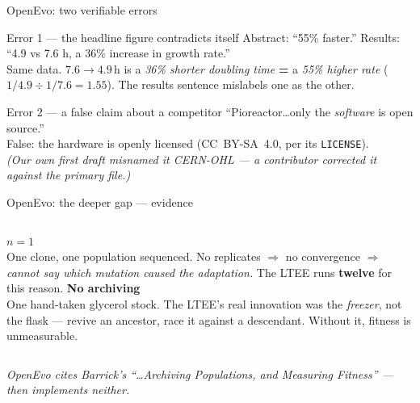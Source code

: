 \documentclass[aspectratio=169,11pt]{beamer}
\newcommand{\bd}[1]{\textcolor{bad}{#1}}
\begin{document}
\begin{frame}{OpenEvo: two verifiable errors}
  \begin{block}{\bd{Error 1} --- the headline figure contradicts itself}
  Abstract: ``\bd{55\% faster}.'' \quad Results: ``4.9 vs 7.6 h, a \bd{36\% increase in growth rate}.'' \\
  Same data. $7.6\!\to\!4.9$\,h is a \emph{36\% shorter doubling time} \textbf{=} a \emph{55\% higher rate}
  ($1/4.9 \div 1/7.6 = 1.55$). The results sentence mislabels one as the other.
  \end{block}
  \begin{block}{\bd{Error 2} --- a false claim about a competitor}
  ``Pioreactor\dots only the \emph{software} is open source.'' \\
  False: the hardware is openly licensed (CC~BY-SA~4.0, per its \texttt{LICENSE}). \\
  \small\emph{(Our own first draft misnamed it CERN-OHL --- a contributor corrected it against the primary file.)}
  \end{block}
\end{frame}

\begin{frame}{OpenEvo: the deeper gap --- evidence}
  \begin{columns}[T]
      \textbf{\bd{$n=1$}} \\[0.3em]
      One clone, one population sequenced. No replicates $\Rightarrow$ no convergence $\Rightarrow$
      \emph{cannot say which mutation caused the adaptation.} The LTEE runs \textbf{twelve} for this reason.
      \textbf{\bd{No archiving}} \\[0.3em]
      One hand-taken glycerol stock. The LTEE's real innovation was the \emph{freezer}, not the flask
      --- revive an ancestor, race it against a descendant. Without it, fitness is unmeasurable.
  \end{columns}
  \vspace{0.8em}
  \begin{center}
  \emph{OpenEvo cites Barrick's ``\dots Archiving Populations, and Measuring Fitness'' --- then implements neither.}
  \end{center}
\end{frame}
\end{document}
